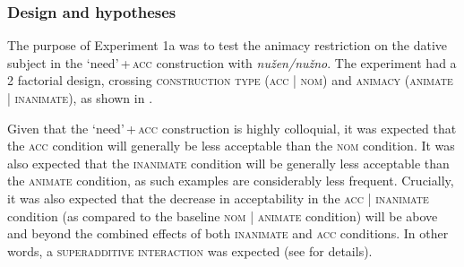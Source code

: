 \documentclass[output=paper]{langscibook}
\begin{document}
\subsubsection{Design and hypotheses}

The purpose of Experiment 1a was to test the animacy restriction on the dative subject in the `need'\,+\,\textsc{acc} construction with \textit{nužen/nužno}. The experiment had a 2 factorial design, crossing \textsc{construction type} (\textsc{acc} | \textsc{nom}) and \textsc{animacy} (\textsc{animate} | \textsc{inanimate}), as shown in .

\ea \label{exp1-materials}
\z\z

\noindent Given that the `need'\,+\,\textsc{acc} construction is highly colloquial, it was expected that the \textsc{acc} condition will generally be less acceptable than the \textsc{nom} condition. It was also expected that the \textsc{inanimate} condition will be generally less acceptable than the \textsc{animate} condition, as such examples are considerably less frequent. Crucially, it was also expected that the decrease in acceptability in the \textsc{acc} | \textsc{inanimate} condition (as compared to the baseline \textsc{nom} | \textsc{animate} condition) will be above and beyond the combined effects of both \textsc{inanimate} and \textsc{acc} conditions. In other words, a \textsc{superadditive interaction} was expected (see \citealt{Sprouse.Wagers.Phillips2012} for details).
\end{document}
